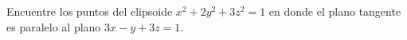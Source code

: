 \item Encuentre los puntos del elipsoide $x^2 + 2y^2 + 3z^2 = 1$ en donde el plano tangente es paralelo al plano $3x - y + 3z = 1$.
